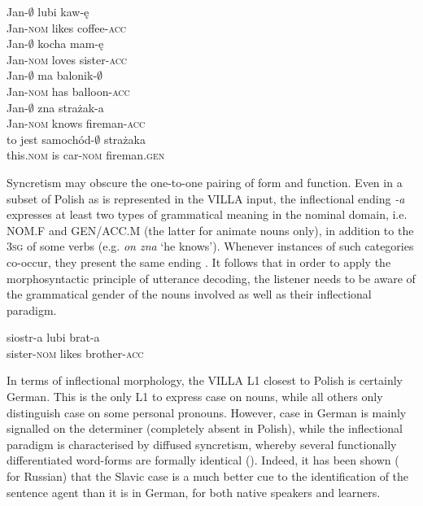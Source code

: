 \ea%
    \label{ex:02:4}
    \ea\label{ex:02:4a}
    \gll    Jan-${\emptyset}$ lubi kaw-ę\\
            Jan-\textsc{nom}  likes    coffee-\textsc{acc}\\
    \ex\label{ex:02:4b}
    \gll    Jan-${\emptyset}$ kocha mam-ę\\
            Jan-\textsc{nom} loves sister-\textsc{acc}\\
    \ex\label{ex:02:4c}
    \gll    Jan-${\emptyset}$ ma balonik-${\emptyset}$\\
            Jan-\textsc{nom} has balloon-\textsc{acc}\\
    \ex\label{ex:02:4d}
    \gll    Jan-${\emptyset}$ zna strażak-a\\
            Jan-\textsc{nom} knows fireman-\textsc{acc}\\
    \ex\label{ex:02:4e}
    \gll    to jest samochód-${\emptyset}$ strażaka\\
            this.\textsc{nom}  is  car-\textsc{nom}  fireman.\textsc{gen}\\
    \z
\z

Syncretism may obscure the one-to-one pairing of form and function. Even in a subset of Polish as is represented in the VILLA input, the inflectional ending \textit{-a} expresses at least two types of grammatical meaning in the nominal domain, i.e. NOM.F and GEN/ACC.M (the latter for animate nouns only), in addition to the 3\textsc{sg} of some verbs (e.g. \textit{on zna} ‘he knows’). Whenever instances of such categories co-occur, they present the same ending . It follows that in order to apply the morphosyntactic principle of utterance decoding, the listener needs to be aware of the grammatical gender of the nouns involved as well as their inflectional paradigm.

\ea%
    \label{ex:02:5}
    \gll    siostr-a lubi brat-a\\
            sister-\textsc{nom}  likes  brother-\textsc{acc}\\
    \z

In terms of inflectional morphology, the VILLA L1 closest to Polish is certainly German. This is the only L1 to express case on nouns, while all others only distinguish case on some personal pronouns. However, case in German is mainly signalled on the determiner (completely absent in Polish), while the inflectional paradigm is characterised by diffused syncretism, whereby several functionally differentiated word-forms are formally identical (). Indeed, it has been shown (\citealt{KempeMacWhinney1998, KempeMacWhinney1999} for Russian) that the Slavic case is a much better cue to the identification of the sentence agent than it is in German, for both native speakers and learners.

